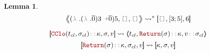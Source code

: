\documentclass[english, references=cleveref]{programming}
\newtheorem{lemma}[theorem]{Lemma}
\newcommand{\leval}{\left\langle\!\!\left\langle}
\newcommand{\reval}{\right\rangle\!\!\right\rangle}
\newcommand{\lcont}{\left[\!\!\left[}
\newcommand{\rcont}{\right]\!\!\right]}
\begin{document}
\begin{lemma}
  \[{{\leval {{ ( \synlambda. {{{ ( \synlambda. { \overline{\synvar{ 0}} }) } { \ghostvalue { \ghostint 3}}} \synpunct{ +} { \overline{\synvar{ 0}} }}) } { \ghostvalue { \ghostint 5}}}, \synpunct{[]}, \synpunct{[]} \reval} \leadsto^* {\lcont \synpunct{[]}, { [{ \ghostint 3}; { \ghostint 5}] }, {{ \ghostint 6}} \rcont}}\]
\end{lemma}


\[{{\lcont {{ \synCClo( t_{cl}, \sigma_{cl}) } \syncons \kappa}, \sigma, {v} \rcont} \leadsto {\leval t_{cl}, {{ \synReturn( \sigma) } \syncons \kappa}, {v \syncons \sigma_{cl}} \reval}}\]
\[{{\lcont {{ \synReturn( \sigma) } \syncons \kappa}, \sigma_{cl}, {v} \rcont} \leadsto {\lcont \kappa, \sigma, {v} \rcont}}\]


\printbibliography
\end{document}
